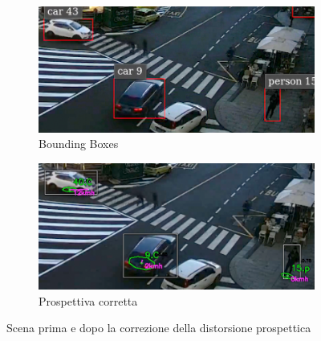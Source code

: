 \begin{figure}[h]
    \centering
    \begin{subfigure}{.49\textwidth}
        \includegraphics[width=\textwidth]{images/yolo.png}
        \caption{Bounding Boxes}
        \label{fig:perspbbox}
    \end{subfigure}
    \hfill
    \begin{subfigure}{.49\textwidth}
        \includegraphics[width=\textwidth]{images/corrected.png}
        \caption{Prospettiva corretta}
        \label{fig:perspcorrect}
    \end{subfigure}
    \caption{Scena prima e dopo la correzione della distorsione prospettica}
\end{figure}
